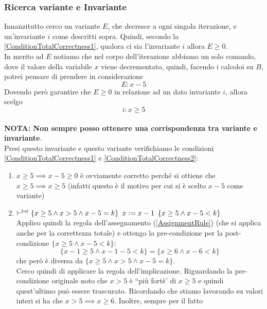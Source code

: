 \begin{esempio}
				      					\subsubsection{Ricerca variante e Invariante}
				      					Innanzitutto cerco un variante $E$, che decresce a ogni singola iterazione, e
				      					un'invariante $i$ come descritti sopra. Quindi, secondo la \ref{ConditionTotalCorrectness1}, qualora ci sia
				      					l'invariante $i$ allora  $E\geq 0$.\\
				      					In merito ad $E$ notiamo che nel corpo dell'iterazione abbiamo un solo	comando, dove il valore della variabile $x$ viene decrementato, quindi, facendo i calcoloi su $B$, potrei pensare di prendere in considerazione 
				      					\[E: x - 5\]
				      					Dovendo però garantire che $E\geq 0$ in relazione ad un dato invariante $i$, allora scelgo
				      					\[i: x \geq 5\] \\		\textbf{NOTA: Non sempre posso ottenere una corrispondenza tra variante e
				      						invariante}.\\
				      					Presi questo invariante e questo variante verifichiamo le condizioni \ref{ConditionTotalCorrectness1} e \ref{ConditionTotalCorrectness2}:
				      					\begin{enumerate}
				      						\item $x\geq 5\implies x-5\geq 0$ è ovviamente corretto perché si ottiene
				      						      che $x\geq 5\implies x \geq 5$ (infatti questo è il motivo per cui si è
				      						      scelto $x-5$ come variante)
				      						\item $\vdash^{tot}\{x\geq 5\land x>5\land x-5=k\}\,\,\, x\cceq
				      						      x-1\,\,\,\{x\geq 5\land x-5<k\}$\\
				      						      Applico quindi la regola dell'assegnamento (\ref{AssignmentRule}) (che si applica anche per la
				      						      correttezza totale) e ottengo la pre-condizione per la post-condizione
				      						      $\{x\geq 5\land x-5<k\}$:
				      						      \[\{x-1\geq 5\land x-1-5<k\}=\{x\geq 6\land x-6 < k\}\]
				      						      che però è diversa da $\{x\geq 5\land x>5\land x-5=k\}$.\\
				      						      Cerco quindi di applicare la regola dell'implicazione. Riguardando la
				      						      pre-condizione originale noto che $x>5$ è ``più fortè' di $x\geq 5$ e quindi
				      						      quest'ultimo può essere trascurato. Ricordando che stiamo lavorando su
				      						      valori interi si ha che $x>5\implies x\geq 6$. Inoltre, sempre per il fatto

\end{enumerate}
\end{esempio}
